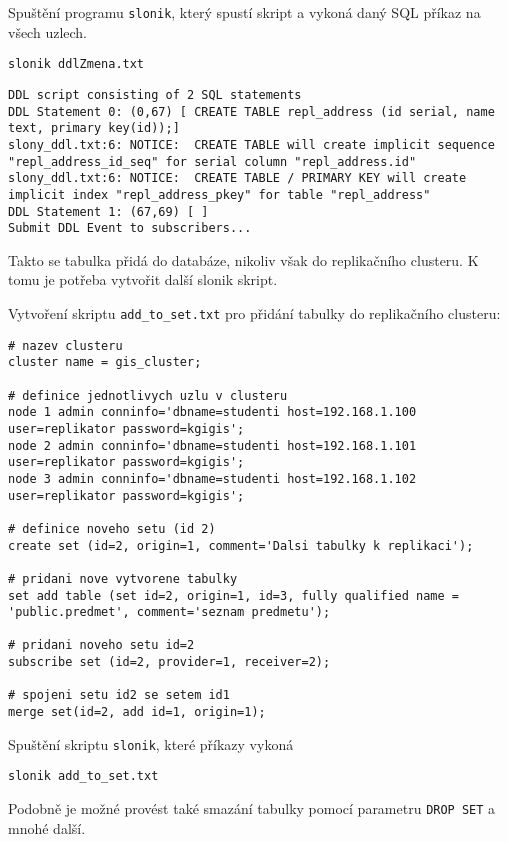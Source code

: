 Spuštění programu \texttt{slonik}, který spustí skript a vykoná daný SQL příkaz na všech uzlech. 

\begin{lstlisting}
slonik ddlZmena.txt
\end{lstlisting}
\begin{lstlisting}[identifierstyle=\color{black},stringstyle=\color{black},keywordstyle=\color{black}]
DDL script consisting of 2 SQL statements
DDL Statement 0: (0,67) [ CREATE TABLE repl_address (id serial, name text, primary key(id));]
slony_ddl.txt:6: NOTICE:  CREATE TABLE will create implicit sequence "repl_address_id_seq" for serial column "repl_address.id"
slony_ddl.txt:6: NOTICE:  CREATE TABLE / PRIMARY KEY will create implicit index "repl_address_pkey" for table "repl_address"
DDL Statement 1: (67,69) [ ]
Submit DDL Event to subscribers...
\end{lstlisting}


Takto se tabulka přidá do databáze, nikoliv však do replikačního clusteru. K tomu je potřeba vytvořit další slonik skript. 

Vytvoření skriptu \texttt{add\_to\_set.txt} pro přidání tabulky do replikačního clusteru:

\begin{lstlisting}[identifierstyle=\color{black},stringstyle=\color{black},keywordstyle=\color{black}]
# nazev clusteru
cluster name = gis_cluster;

# definice jednotlivych uzlu v clusteru
node 1 admin conninfo='dbname=studenti host=192.168.1.100 user=replikator password=kgigis';
node 2 admin conninfo='dbname=studenti host=192.168.1.101 user=replikator password=kgigis';
node 3 admin conninfo='dbname=studenti host=192.168.1.102 user=replikator password=kgigis';

# definice noveho setu (id 2)
create set (id=2, origin=1, comment='Dalsi tabulky k replikaci');

# pridani nove vytvorene tabulky
set add table (set id=2, origin=1, id=3, fully qualified name = 'public.predmet', comment='seznam predmetu');

# pridani noveho setu id=2
subscribe set (id=2, provider=1, receiver=2);

# spojeni setu id2 se setem id1
merge set(id=2, add id=1, origin=1);
\end{lstlisting}

Spuštění skriptu \texttt{slonik}, které příkazy vykoná

\begin{lstlisting}
slonik add_to_set.txt
\end{lstlisting}

Podobně je možné provést také smazání tabulky pomocí parametru \texttt{DROP SET} a mnohé další. 

